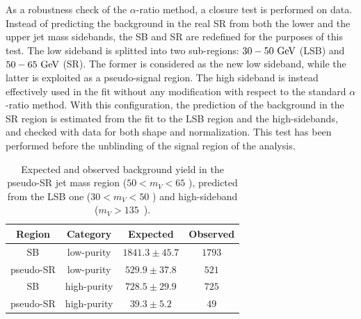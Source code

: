 \vspace*{1\baselineskip}

\noindent As a robustness check of the $\alpha$-ratio method, a closure test is performed on data. Instead of predicting the background in the real SR from both the lower and the upper jet mass sidebands, the SB and SR are redefined for the purposes of this test. The low sideband is splitted into two sub-regions: $30-50~\text{GeV}$ (LSB) and $50-65~\text{GeV}$ (SR). The former is considered as the new low sideband, while the latter is exploited as a pseudo-signal region. The high sideband is instead effectively used in the fit without any modification with respect to the standard $\alpha$-ratio method. With this configuration, the prediction of the background in the SR region is estimated from the fit to the LSB region and the high-sidebands, and checked with data for both shape and normalization. This test has been performed before the unblinding of the signal region of the analysis.

\begin{table}[!htb]
  \begin{center}
  \caption{Expected and observed background yield in the pseudo-SR jet mass region ($ 50 < m_V < 65$ \GeV), predicted from the LSB one ($30 < m_V < 50$ \GeV) and high-sideband ($m_V > 135$~\GeV).}\label{tab:alphaClosure}
    \begin{tabular}{cc|cc}
      Region & Category & Expected & Observed \\
      \hline
      \hline
      SB & low-purity & $1841.3 \pm 45.7$ & $1793$ \\
      pseudo-SR & low-purity & $529.9 \pm 37.8$ & $521$ \\
      \hdashline
      SB & high-purity & $728.5 \pm 29.9$ & $725$ \\
      pseudo-SR & high-purity & $39.3 \pm 5.2$ & $49$ \\
    \end{tabular}
  \end{center}

\end{table}

